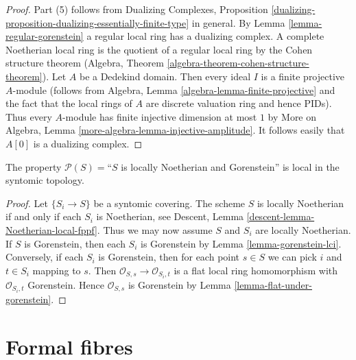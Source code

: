 \begin{proof}
Part (5) follows from
Dualizing Complexes, Proposition
\ref{dualizing-proposition-dualizing-essentially-finite-type}
in general.
By Lemma \ref{lemma-regular-gorenstein} a regular local ring has a
dualizing complex.
A complete Noetherian local ring is the quotient of a regular
local ring by the Cohen structure theorem
(Algebra, Theorem \ref{algebra-theorem-cohen-structure-theorem}).
Let $A$ be a Dedekind domain. Then every ideal $I$ is a finite
projective $A$-module (follows from
Algebra, Lemma \ref{algebra-lemma-finite-projective}
and the fact that the local rings of $A$ are discrete valuation ring
and hence PIDs). Thus every $A$-module has finite injective dimension
at most $1$ by
More on Algebra, Lemma \ref{more-algebra-lemma-injective-amplitude}.
It follows easily that $A[0]$ is a dualizing complex.
\end{proof}

\begin{lemma}
\label{lemma-gorenstein-local-syntomic}
The property $\mathcal{P}(S) =$``$S$ is locally Noetherian and Gorenstein''
is local in the syntomic topology.
\end{lemma}

\begin{proof}
Let $\{S_i \to S\}$ be a syntomic covering. The scheme $S$ is locally
Noetherian if and only if each $S_i$ is Noetherian, see
Descent, Lemma \ref{descent-lemma-Noetherian-local-fppf}.
Thus we may now assume $S$ and $S_i$ are locally Noetherian.
If $S$ is Gorenstein, then
each $S_i$ is Gorenstein by Lemma \ref{lemma-gorenstein-lci}.
Conversely, if each $S_i$ is Gorenstein, then for each point
$s \in S$ we can pick $i$ and $t \in S_i$ mapping to $s$.
Then $\mathcal{O}_{S, s} \to \mathcal{O}_{S_i, t}$
is a flat local ring homomorphism with $\mathcal{O}_{S_i, t}$
Gorenstein. Hence $\mathcal{O}_{S, s}$ is Gorenstein by
Lemma \ref{lemma-flat-under-gorenstein}.
\end{proof}





\section{Formal fibres}
\label{section-formal-fibres}

